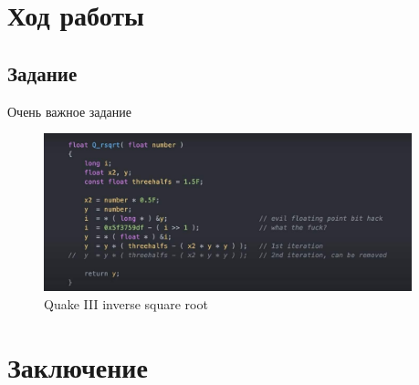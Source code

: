 \documentclass[fontsize=14pt, paper=a4, pagesize, DIV=calc]{scrreprt}
\begin{document}

\chapter{Ход работы}

\section{Задание }

Очень важное задание

\begin{figure}[H]
  \centering
  \includegraphics[interpolate, width=0.95\textwidth]{Q_rsqrt}
  \caption{Quake III inverse square root}
  \label{fig:rsqrt}
\end{figure}



\chapter{Заключение}

\lipsum[3-4]

\nocite{*} %
\printbibliography[
  heading=bibintoc,
  title={СПИСОК ИСПОЛЬЗОВАННЫХ ИСТОЧНИКОВ},
]
\end{document}
